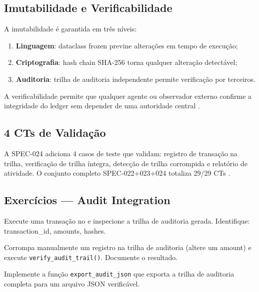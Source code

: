 \subsection{Imutabilidade e Verificabilidade}

A imutabilidade é garantida em três níveis:

\begin{enumerate}
\item \textbf{Linguagem}: dataclass frozen previne alterações
em tempo de execução;
\item \textbf{Criptografia}: hash chain SHA-256 torna qualquer
alteração detectável;
\item \textbf{Auditoria}: trilha de auditoria independente permite
verificação por terceiros.
\end{enumerate}

A verificabilidade permite que qualquer agente ou observador
externo confirme a integridade do ledger sem depender de uma
autoridade central \cite{opencode2026token}.

\subsection{4 CTs de Validação}

A SPEC-024 adiciona 4 casos de teste que validam: registro de
transação na trilha, verificação de trilha íntegra, detecção de
trilha corrompida e relatório de atividade. O conjunto completo
SPEC-022+023+024 totaliza 29/29 CTs \cite{opencode2026token}.

\subsection{Exercícios — Audit Integration}

\begin{exercicio}
Execute uma transação no \opencodeeco{} e inspecione a trilha de
auditoria gerada. Identifique: transaction\_id, amounts, hashes.
\end{exercicio}

\begin{exercicio}
Corrompa manualmente um registro na trilha de auditoria (altere
um amount) e execute \lstinline{verify_audit_trail()}. Documente
o resultado.
\end{exercicio}

\begin{exercicio}
Implemente a função \lstinline{export_audit_json} que exporta a
trilha de auditoria completa para um arquivo JSON verificável.
\end{exercicio}

